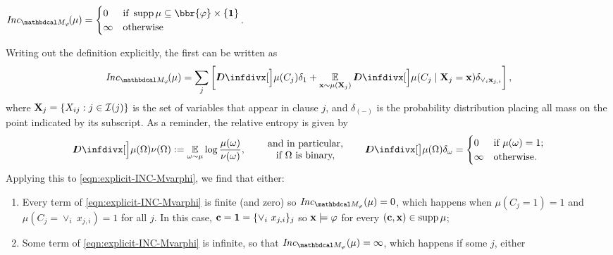 \documentclass[twoside]{article}
\begin{document}
\begin{lproof}
	\begin{iclaim} \label{claim:separate-inc-varphi}
		$\Inc_{\dg M_\varphi}\!(\mu) =
		\begin{cases}
			0 & \text{if}~  \supp \mu \subseteq \bbr{\varphi} \times \{ \mat 1\} \\
			\infty & \text{otherwise}
		\end{cases}$.
	\end{iclaim}
	\vspace{-1em}
	\begin{lproof}
		Writing out the definition explicitly, the first can be written as
		\begin{equation}
			\Inc_{\dg M_\varphi}\!(\mu) = \sum_{j} \left[ \kldiv[\Big]{\mu(C_j)}{\delta_1} +
				\Ex_{\mat x \sim \mu(\mat X_j)} \kldiv[\Big]{\mu(C_j \mid \mat X_j = \mat x)}{\delta_{\lor_i \mat x_{j,i}}} \right], \label{eqn:explicit-INC-Mvarphi}
		\end{equation}
		where $\mathbf{X}_j = \{X_{ij} : j \in \mathcal I(j)\}$ is the set of variables that
		appear in clause $j$, and $\delta_{(-)}$ is the probability distribution placing all mass on the point indicated by its subscript.
		As a reminder, the relative entropy is given by
		\[ \kldiv[\Big]{\mu(\Omega)}{\nu(\Omega)} := \Ex_{\omega \sim \mu} \log \frac{\mu(\omega)}{\nu(\omega)},
		\quad\parbox{1.4in}{\centering and in particular, \\ if $\Omega$ is binary,}\quad
			\kldiv[\big]{\mu(\Omega)}{\delta_\omega} = \begin{cases}
				0 &  \text{if}~\mu(\omega) = 1 ; \\
				\infty & \text{otherwise}.
		\end{cases} \]
		Applying this to \eqref{eqn:explicit-INC-Mvarphi}, we find that either:
		\begin{enumerate}[itemsep=0pt]
			\item Every term of \eqref{eqn:explicit-INC-Mvarphi} is finite (and zero) so $\Inc_{\dg M_\varphi}(\mu) = 0$, which happens when $\mu(C_j = 1) = 1$ and $\mu(C_j = \vee_i~ x_{j,i}) = 1$ for all $j$.  In this case, $\mathbf{c} = \mathbf{1} = \{ \vee_i~x_{j,i} \}_j$ so $\mathbf{x} \models \varphi$ for every $(\mathbf{c,x}) \in \operatorname{\mathrm{supp}} \mu$;
			\item Some term of \eqref{eqn:explicit-INC-Mvarphi} is infinite, so that $\Inc_{\dg M_\varphi}(\mu) = \infty$, which happens if some $j$, either


\end{enumerate}
\end{lproof}
\end{lproof}
\end{document}
